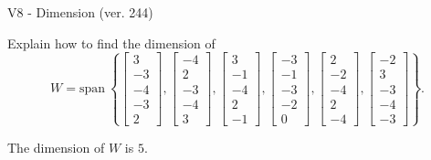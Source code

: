 \begin{exercise}
  \begin{exerciseTitle}V8 - Dimension (ver. 244)\end{exerciseTitle}
  \begin{exerciseStatement}
    Explain how to find the dimension of 
\[W=\mathrm{span}\ \left\{\left[\begin{array}{r}
3 \\
-3 \\
-4 \\
-3 \\
2
\end{array}\right] , \left[\begin{array}{r}
-4 \\
2 \\
-3 \\
-4 \\
3
\end{array}\right] , \left[\begin{array}{r}
3 \\
-1 \\
-4 \\
2 \\
-1
\end{array}\right] , \left[\begin{array}{r}
-3 \\
-1 \\
-3 \\
-2 \\
0
\end{array}\right] , \left[\begin{array}{r}
2 \\
-2 \\
-4 \\
2 \\
-4
\end{array}\right] , \left[\begin{array}{r}
-2 \\
3 \\
-3 \\
-4 \\
-3
\end{array}\right]\right\}.\]



  \end{exerciseStatement}
  \begin{exerciseAnswer}
   The dimension of \(W\) is  \(5\).
  


  \end{exerciseAnswer}
\end{exercise}